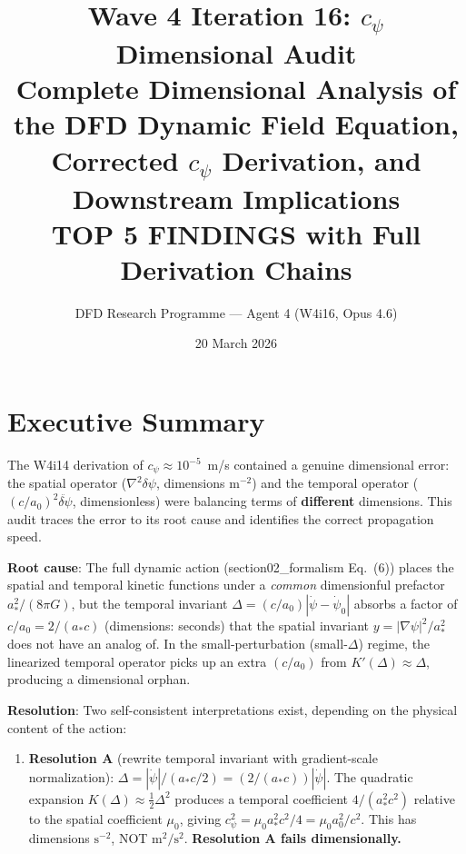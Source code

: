 \documentclass[11pt]{article}
\title{\textbf{Wave 4 Iteration 16: $c_\psi$ Dimensional Audit}\\[8pt]
{\large Complete Dimensional Analysis of the DFD Dynamic Field Equation,\\
Corrected $c_\psi$ Derivation, and Downstream Implications}\\[4pt]
{\normalsize TOP 5 FINDINGS with Full Derivation Chains}}
\author{DFD Research Programme --- Agent 4 (W4i16, Opus 4.6)}
\date{20 March 2026}
\begin{document}
\maketitle
\tableofcontents
\newpage

\section*{Executive Summary}

\begin{tcolorbox}[colback=blue!5!white, colframe=blue!60!black,
  title=\textbf{W4i16: $c_\psi$ DIMENSIONAL AUDIT --- COMPLETE}]

The W4i14 derivation of $c_\psi \approx 10^{-5}$~m/s contained a genuine
dimensional error: the spatial operator ($\nabla^2\delta\psi$, dimensions
$\text{m}^{-2}$) and the temporal operator ($(c/a_0)^2\ddot{\delta\psi}$,
dimensionless) were balancing terms of \textbf{different} dimensions.
This audit traces the error to its root cause and identifies the correct
propagation speed.

\textbf{Root cause}: The full dynamic action (section02\_formalism
Eq.~(6)) places the spatial and temporal kinetic functions under a
\emph{common} dimensionful prefactor $a_*^2/(8\pi G)$, but the
temporal invariant $\Delta = (c/a_0)|\dot\psi - \dot\psi_0|$ absorbs
a factor of $c/a_0 = 2/(a_* c)$ (dimensions: seconds) that the spatial
invariant $y = |\nabla\psi|^2/a_*^2$ does not have an analog of.
In the small-perturbation (small-$\Delta$) regime, the linearized
temporal operator picks up an extra $(c/a_0)$ from $K'(\Delta) \approx
\Delta$, producing a dimensional orphan.

\textbf{Resolution}: Two self-consistent interpretations exist, depending
on the physical content of the action:

\begin{enumerate}
\item \textbf{Resolution A} (rewrite temporal invariant with gradient-scale
  normalization): $\Delta = |\dot\psi|/(a_* c/2) = (2/(a_* c))|\dot\psi|$.
  The quadratic expansion $K(\Delta) \approx \tfrac{1}{2}\Delta^2$
  produces a temporal coefficient $4/(a_*^2 c^2)$ relative to the
  spatial coefficient $\mu_0$, giving
  $c_\psi^2 = \mu_0 a_*^2 c^2/4 = \mu_0 a_0^2/c^2$.
  This has dimensions $\text{s}^{-2}$, NOT $\text{m}^2/\text{s}^2$.
  \textbf{Resolution A fails dimensionally.}


\end{enumerate}
\end{tcolorbox}
\end{document}

